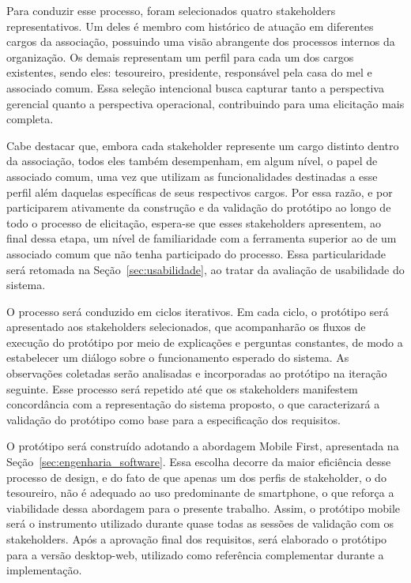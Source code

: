 Para conduzir esse processo, foram selecionados quatro stakeholders representativos. Um deles é membro com histórico de atuação em diferentes cargos da associação, possuindo uma visão abrangente dos processos internos da organização. Os demais representam um perfil para cada um dos cargos existentes, sendo eles: tesoureiro, presidente, responsável pela casa do mel e associado comum. Essa seleção intencional busca capturar tanto a perspectiva gerencial quanto a perspectiva operacional, contribuindo para uma elicitação mais completa.

Cabe destacar que, embora cada stakeholder represente um cargo distinto dentro da associação, todos eles também desempenham, em algum nível, o papel de associado comum, uma vez que utilizam as funcionalidades destinadas a esse perfil além daquelas específicas de seus respectivos cargos. Por essa razão, e por participarem ativamente da construção e da validação do protótipo ao longo de todo o processo de elicitação, espera-se que esses stakeholders apresentem, ao final dessa etapa, um nível de familiaridade com a ferramenta superior ao de um associado comum que não tenha participado do processo. Essa particularidade será retomada na Seção~\ref{sec:usabilidade}, ao tratar da avaliação de usabilidade do sistema.

O processo será conduzido em ciclos iterativos. Em cada ciclo, o protótipo será apresentado aos stakeholders selecionados, que acompanharão os fluxos de execução do protótipo por meio de explicações e perguntas constantes, de modo a estabelecer um diálogo sobre o funcionamento esperado do sistema. As observações coletadas serão analisadas e incorporadas ao protótipo na iteração seguinte. Esse processo será repetido até que os stakeholders manifestem concordância com a representação do sistema proposto, o que caracterizará a validação do protótipo como base para a especificação dos requisitos.

O protótipo será construído adotando a abordagem {Mobile First}, apresentada na Seção~\ref{sec:engenharia_software}. Essa escolha decorre da maior eficiência desse processo de design, e do fato de que apenas um dos perfis de stakeholder, o do tesoureiro, não é adequado ao uso predominante de smartphone, o que reforça a viabilidade dessa abordagem para o presente trabalho. Assim, o protótipo mobile será o instrumento utilizado durante quase todas as sessões de validação com os stakeholders. Após a aprovação final dos requisitos, será elaborado o protótipo para a versão desktop-web, utilizado como referência complementar durante a implementação.


